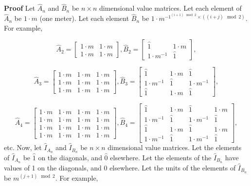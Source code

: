 \documentclass[10pt,letterpaper]{article}
\newenvironment{proof}{\noindent\textbf{Proof} }{\qed \newline}
\newcommand{\qed}{\nobreak \ifvmode \relax \else
      \ifdim\lastskip<1.5em \hskip-\lastskip
      \hskip1.5em plus0em minus0.5em \fi \nobreak
      \vrule height0.75em width0.5em depth0.25em\fi}
\numberwithin{equation}{section}
\begin{document}
\begin{proof}Let $\hat A_n$ and $\hat B_n$ be $n \times n$ dimensional
  value matrices.  Let each element of $\hat A_n$ be $1 \cdot m$ (one
  meter).  Let each element $\hat B_n$ be $1 \cdot m^{-1^{(i + 1) \mod
      2} \times ((i + j) \mod 2)}$.  For example,
 
\[ \hat A_2 = \left[ \begin{matrix} 
  1 \cdot m & 1 \cdot m \\
  1 \cdot m & 1 \cdot m
 \end{matrix} \right],
 \hat B_2 = \left[ \begin{matrix} 
  \hat 1 & 1 \cdot m \\
  1 \cdot m^{-1} & \hat 1
 \end{matrix} \right], \]

\[ \hat A_3 = \left[ \begin{matrix} 
  1 \cdot m & 1 \cdot m & 1 \cdot m \\
  1 \cdot m & 1 \cdot m & 1 \cdot m \\
  1 \cdot m & 1 \cdot m & 1 \cdot m
 \end{matrix} \right],
 \hat B_3 = \left[ \begin{matrix} 
  \hat 1 & 1 \cdot m & \hat 1 \\
  1 \cdot m^{-1} & \hat 1 & 1 \cdot m^{-1} \\
  \hat 1 & 1 \cdot m & \hat 1
 \end{matrix} \right], \]

\[ \hat A_4 = \left[ \begin{matrix} 
  1 \cdot m & 1 \cdot m & 1 \cdot m & 1 \cdot m \\
  1 \cdot m & 1 \cdot m & 1 \cdot m & 1 \cdot m \\
  1 \cdot m & 1 \cdot m & 1 \cdot m & 1 \cdot m \\
  1 \cdot m & 1 \cdot m & 1 \cdot m & 1 \cdot m
 \end{matrix} \right],
 \hat B_4 = \left[ \begin{matrix} 
  \hat 1 & 1 \cdot m & \hat 1 & 1 \cdot m \\
  1 \cdot m^{-1} & \hat 1 & 1 \cdot m^{-1} & \hat 1 \\
  \hat 1 & 1 \cdot m & \hat 1 & 1 \cdot m \\
  1 \cdot m^{-1} & \hat 1 & 1 \cdot m^{-1} & \hat 1
\end{matrix} \right], \] etc.  Now, let $\hat I_{A_n}$ and $\hat
I_{B_n}$ be $n \times n$ dimensional value matrices.  Let the elements
of $\hat I_{A_n}$ be $\hat 1$ on the diagonals, and $\hat 0$
elsewhere.  Let the elements of the $\hat I_{B_n}$ have values of 1 on
the diagonals, and 0 elsewhere.  Let the units of the elements of
$\hat I_{B_n}$ be $m^{(j + 1) \mod 2}$.  For example,


\end{proof}
\end{document}

